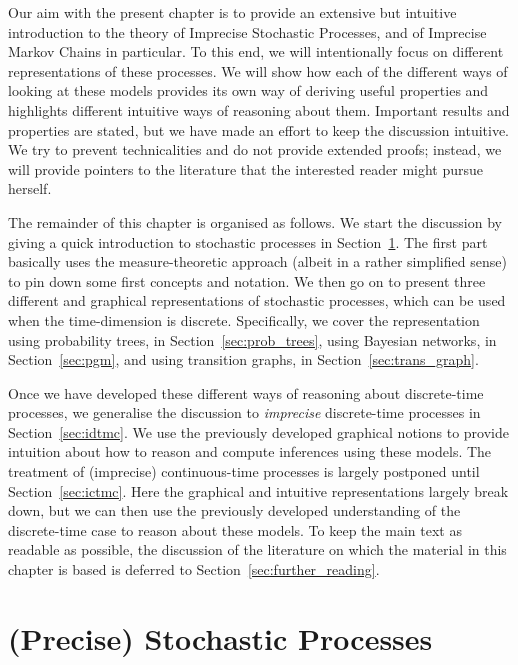 \documentclass[graybox]{svmult}
\begin{document}
Our aim with the present chapter is to provide an extensive but intuitive introduction to the theory of Imprecise Stochastic Processes, and of Imprecise Markov Chains in particular. To this end, we will intentionally focus on different representations of these processes. We will show how each of the different ways of looking at these models provides its own way of deriving useful properties and highlights different intuitive ways of reasoning about them. Important results and properties are stated, but we have made an effort to keep the discussion intuitive. We try to prevent technicalities and do not provide extended proofs; instead, we will provide pointers to the literature that the interested reader might pursue herself.

The remainder of this chapter is organised as follows. We start the discussion by giving a quick introduction to stochastic processes in Section~\ref{sec:prec_stoch_proc}. The first part basically uses the measure-theoretic approach (albeit in a rather simplified sense) to pin down some first concepts and notation. We then go on to present three different and graphical representations of stochastic processes, which can be used when the time-dimension is discrete. Specifically, we cover the representation using probability trees, in Section~\ref{sec:prob_trees}, using Bayesian networks, in Section~\ref{sec:pgm}, and using transition graphs, in Section~\ref{sec:trans_graph}.

Once we have developed these different ways of reasoning about discrete-time processes, we generalise the discussion to \emph{imprecise} discrete-time processes in Section~\ref{sec:idtmc}. We use the previously developed graphical notions to provide intuition about how to reason and compute inferences using these models. The treatment of (imprecise) continuous-time processes is largely postponed until Section~\ref{sec:ictmc}. Here the graphical and intuitive representations largely break down, but we can then use the previously developed understanding of the discrete-time case to reason about these models. To keep the main text as readable as possible, the discussion of the literature on which the material in this chapter is based is deferred to Section~\ref{sec:further_reading}.

\section{(Precise) Stochastic Processes}\label{sec:prec_stoch_proc}
\end{document}

